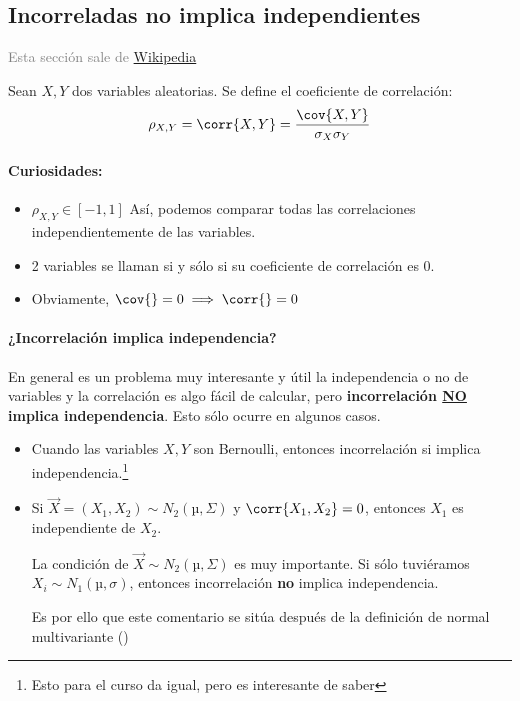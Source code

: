 \subsection{Incorreladas no implica independientes}
\label{sec:incorrnotindep}
\textcolor{grey}{Esta sección sale de \href{https://en.wikipedia.org/wiki/Normally_distributed_and_uncorrelated_does_not_imply_independent}{Wikipedia}}


\begin{defn}[Correlación]
Sean $X,Y$ dos variables aleatorias. Se define el coeficiente de correlación:
\[\rho_{X,Y}=\corr{X,Y}={\cov{X,Y} \over \sigma_X \sigma_Y}\]

\paragraph{Curiosidades:}

\begin{itemize}
	\item $\rho_{X,Y} ∈ [-1,1]$ Así, podemos comparar todas las correlaciones independientemente de las variables.
	\item 2 variables se llaman  si y sólo si su coeficiente de correlación es $0$.
	\item Obviamente, $\cov{} = 0 \implies \corr{} = 0$
\end{itemize}
\end{defn}


\paragraph{¿Incorrelación implica independencia?}

En general es un problema muy interesante y útil la independencia o no de variables y la correlación es algo fácil de calcular, pero \textbf{incorrelación \underline{NO} implica independencia}. Esto sólo ocurre en algunos casos.

\begin{itemize}
	\item Cuando las variables $X,Y$ son Bernoulli, entonces incorrelación si implica independencia.\footnote{Esto para el curso da igual, pero es interesante de saber}
	\item Si $\vec{X} = (X_1,X_2) \sim N_2(µ,Σ)$ y $\corr{X_1,X_2} = 0$, entonces $X_1$ es independiente de $X_2$. 

	\subitem La condición de $\vec{X} \sim N_2(µ,Σ)$ es muy importante. Si sólo tuviéramos $X_i \sim N_1(µ,σ)$, entonces incorrelación \textbf{no} implica independencia.

	Es por ello que este comentario se sitúa después de la definición de normal multivariante ()
\end{itemize}




